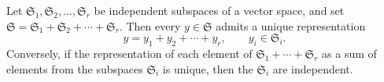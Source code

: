 Let $\mathfrak{S}_1, \mathfrak{S}_2, \ldots, \mathfrak{S}_r$ be independent subspaces of a vector space, and set $\mathfrak{S} = \mathfrak{S}_1 + \mathfrak{S}_2 + \cdots + \mathfrak{S}_r$. Then every $y \in \mathfrak{S}$ admits a unique representation
$$y = y_1 + y_2 + \cdots + y_r, \qquad y_i \in \mathfrak{S}_i.$$
Conversely, if the representation of each element of $\mathfrak{S}_1 + \cdots + \mathfrak{S}_r$ as a sum of elements from the subspaces $\mathfrak{S}_i$ is unique, then the $\mathfrak{S}_i$ are independent.

